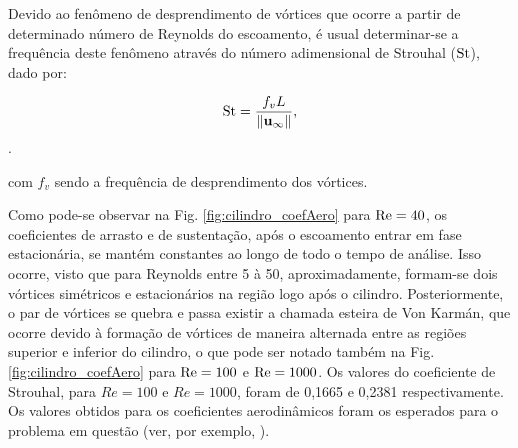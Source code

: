 \documentclass[tese_patricia]{subfiles}%
\begin{document}
Devido ao fenômeno de desprendimento de vórtices que ocorre a partir de determinado número de Reynolds do escoamento, é usual determinar-se a frequência deste fenômeno através do número adimensional de Strouhal ($\mathrm{St}$), dado por:

\begin{align}
	\mathrm{St} = \frac{f_{v}L}{\lVert \mathbf{u}_{\infty} \lVert},
\end{align}.

\noindent com $f_{v}$ sendo a frequência de desprendimento dos vórtices.

Como pode-se observar na Fig. \ref{fig:cilindro_coefAero} para $\mathrm{Re} = 40$, os coeficientes de arrasto e de sustentação, após o escoamento entrar em fase estacionária, se mantém constantes ao longo de todo o tempo de análise. Isso ocorre, visto que para Reynolds entre 5 à 50, aproximadamente, formam-se dois vórtices simétricos e estacionários na região logo após o cilindro. Posteriormente, o par de vórtices se quebra e passa existir a chamada esteira de Von Karmán, que ocorre devido à formação de vórtices de maneira alternada entre as regiões superior e inferior do cilindro, o que pode ser notado também na Fig. \ref{fig:cilindro_coefAero}  para $\mathrm{Re} = 100$ e $\mathrm{Re}=1000$. Os valores do coeficiente de Strouhal, para $Re = 100$ e $Re=1000$, foram de 0,1665 e 0,2381 respectivamente. Os valores obtidos para os coeficientes aerodinâmicos foram os esperados para o problema em questão (ver, por exemplo, ).
\end{document}
